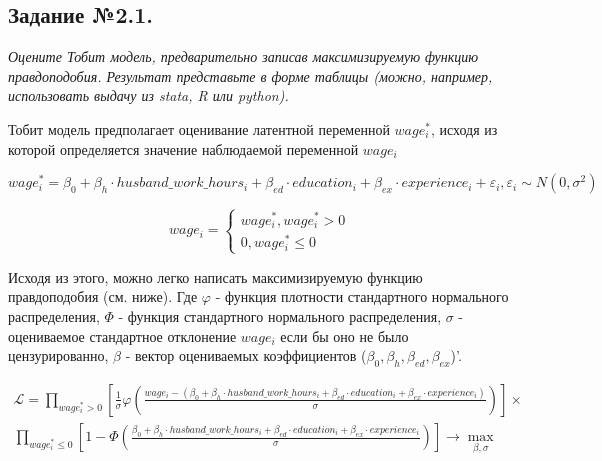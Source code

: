\documentclass[a4paper,12pt]{article}
\begin{document}
	\subsection{Задание №2.1.}
	\textit{Оцените Тобит модель, предварительно записав максимизируемую функцию
правдоподобия. Результат представьте в форме таблицы (можно, например, использовать
выдачу из stata, R или python).}

\vspace{0.2cm}

Тобит модель предполагает оценивание латентной переменной $wage_i^*$, исходя из которой определяется значение наблюдаемой переменной $wage_i$

\begin{equation*}
	wage_i^* =  \beta_0 + \beta_h \cdot husband\_work\_hours_i +\beta_{ed} \cdot education_i + \beta_{ex} \cdot experience_i + \varepsilon_i, \varepsilon_i \sim  N (0, \sigma^2)
\end{equation*}

\begin{equation*}
	wage_i = 
	\begin{cases}
		wage_i^*, wage_i^*  >  0 \\
		 0, wage_i^*  \leq 0
	\end{cases}
\end{equation*}

Исходя из этого, можно легко написать максимизируемую функцию правдоподобия (см. ниже). Где $\varphi$ - функция плотности стандартного нормального распределения, $\Phi$ - функция стандартного нормального распределения, $\sigma$ - оцениваемое стандартное отклонение  $wage_i$ если бы оно не было цензурированно, $\beta$ - вектор оцениваемых коэффициентов ($\beta_0, \beta_h, \beta_{ed}, \beta_{ex}$)'.

\begin{equation*}\label{eq1}
	\begin{aligned}
		\mathcal{L} = \prod_{wage_i^* > 0} \left[\frac{1}{\sigma} \varphi\left(\frac{wage_i-(\beta_0 + \beta_h \cdot husband\_work\_hours_i +\beta_{ed} \cdot education_i + \beta_{ex} \cdot experience_i )}{\sigma}\right) \right] \times \\ 
		\prod_{wage_i^* \leq 0} \left[1-\Phi\left(  \frac{\beta_0 + \beta_h \cdot husband\_work\_hours_i +\beta_{ed} \cdot education_i + \beta_{ex} \cdot experience_i }{\sigma}  \right)    \right] \rightarrow \max_{\beta, \sigma}
	\end{aligned}
\end{equation*}
\end{document}
